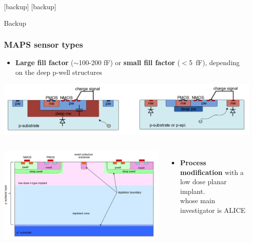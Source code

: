 [backup]
[backup]





    \begin{frame}[noframenumbering]
        Backup        
    \end{frame} 

    \begin{frame}[noframenumbering]
        \frametitle{MAPS sensor types}
            \begin{itemize}
                \item \textbf{Large fill factor} ($\sim$100-200 \si{fF}) or \textbf{small fill factor} ($<$\SI{5}{fF}), depending on the deep p-well structures
            \end{itemize}
            \includegraphics[width=1.05\linewidth]{figures/Pixel_detectors/large_small_sensor_scheme.png}\\
            \begin{columns}
                    \includegraphics[width=1.1\linewidth]{figures/Pixel_detectors/ALPIDE_after_PM.png}
                    \begin{itemize}
                        \item \textbf{Process modification} with a low dose planar implant. \\
                        whose main investigator is ALICE\\
                    \end{itemize} 
            \end{columns}

            \end{frame} 

